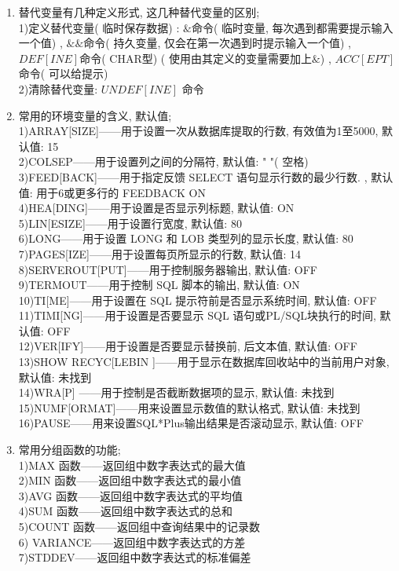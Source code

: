 \documentclass{article}                     %
\numberwithin{equation}{section}            %
\numberwithin{figure}{section}              %
\numberwithin{table}{section}               %
\begin{document}
\begin{enumerate}
 


\item 替代变量有几种定义形式, 这几种替代变量的区别; \\
1)定义替代变量( 临时保存数据) : $\&$命令( 临时变量, 每次遇到都需要提示输入一个值) , $\&\&$命令( 持久变量, 仅会在第一次遇到时提示输入一个值) , $DEF[INE]$命令( CHAR型) ( 使用由其定义的变量需要加上$\&$) , $ACC[EPT]$ 命令( 可以给提示) \\
2)清除替代变量: $UNDEF[INE]$ 命令\\



\item 常用的环境变量的含义, 默认值; \\
1)ARRAY[SIZE]——用于设置一次从数据库提取的行数, 有效值为1至5000, 默认值: 15\\
2)COLSEP——用于设置列之间的分隔符, 默认值: " "( 空格) \\
3)FEED[BACK]——用于指定反馈 SELECT 语句显示行数的最少行数.  , 默认值: 用于6或更多行的 FEEDBACK ON\\
4)HEA[DING]——用于设置是否显示列标题, 默认值: ON\\
5)LIN[ESIZE]——用于设置行宽度, 默认值: 80\\
6)LONG——用于设置 LONG 和 LOB 类型列的显示长度, 默认值: 80\\
7)PAGES[IZE]——用于设置每页所显示的行数, 默认值: 14\\
8)SERVEROUT[PUT]——用于控制服务器输出, 默认值: OFF\\
9)TERMOUT——用于控制 SQL 脚本的输出, 默认值: ON\\
10)TI[ME]——用于设置在 SQL 提示符前是否显示系统时间, 默认值: OFF\\
11)TIMI[NG]——用于设置是否要显示 SQL 语句或PL/SQL块执行的时间, 默认值: OFF\\
12)VER[IFY]——用于设置是否要显示替换前, 后文本值, 默认值: OFF\\
13)SHOW RECYC[LEBIN ]——用于显示在数据库回收站中的当前用户对象, 默认值: 未找到\\
14)WRA[P] ——用于控制是否截断数据项的显示, 默认值: 未找到\\
15)NUMF[ORMAT]——用来设置显示数值的默认格式, 默认值: 未找到\\
16)PAUSE——用来设置SQL*Plus输出结果是否滚动显示, 默认值: OFF\\

\item 常用分组函数的功能; \\
1)MAX 函数——返回组中数字表达式的最大值\\
2)MIN 函数——返回组中数字表达式的最小值\\
3)AVG 函数——返回组中数字表达式的平均值\\
4)SUM 函数——返回组中数字表达式的总和\\
5)COUNT 函数——返回组中查询结果中的记录数\\
6) VARIANCE——返回组中数字表达式的方差\\
7)STDDEV——返回组中数字表达式的标准偏差\\



\end{enumerate}
\end{document}

